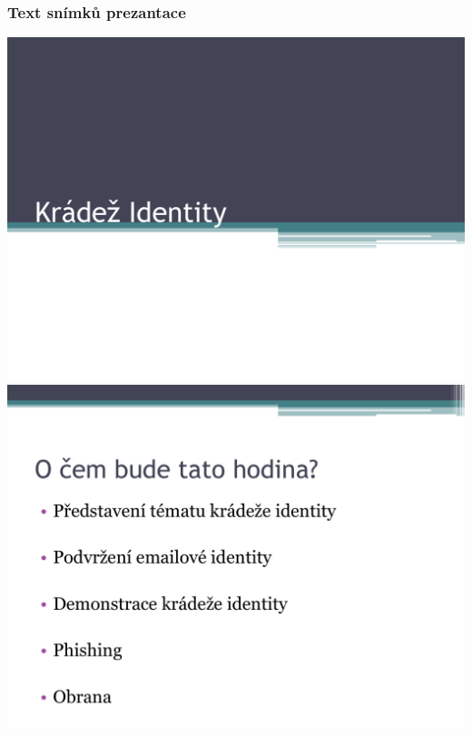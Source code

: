 \documentclass[a4paper, 12pt]{article}
\begin{document}
\subsubsection{Text snímků prezantace}
\includegraphics[scale=0.5]{IdentityTheftSlides/p01.pdf} \\
\vspace{0.5in}
\includegraphics[scale=0.5]{IdentityTheftSlides/p02.pdf} \\
\vspace{0.5in}
\end{document}
